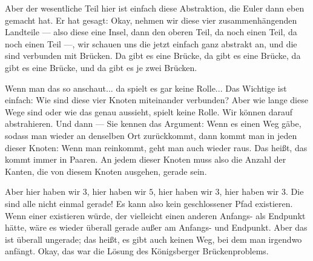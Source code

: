 \begin{spoken-clean}[00:08:07 - 00:09:33]
Aber der wesentliche Teil hier ist einfach diese Abstraktion, die Euler dann eben gemacht hat. Er hat gesagt: Okay, nehmen wir diese vier zusammenhängenden Landteile --- also diese eine Insel, dann den oberen Teil, da noch einen Teil, da noch einen Teil ---, wir schauen uns die jetzt einfach ganz abstrakt an, und die sind verbunden mit Brücken. Da gibt es eine Brücke, da gibt es eine Brücke, da gibt es eine Brücke, und da gibt es je zwei Brücken.

Wenn man das so anschaut... da spielt es gar keine Rolle... Das Wichtige ist einfach: Wie sind diese vier Knoten miteinander verbunden? Aber wie lange diese Wege sind oder wie das genau aussieht, spielt keine Rolle. Wir können darauf abstrahieren. Und dann --- Sie kennen das Argument: Wenn es einen Weg gäbe, sodass man wieder an denselben Ort zurückkommt, dann kommt man in jeden dieser Knoten: Wenn man reinkommt, geht man auch wieder raus. Das heißt, das kommt immer in Paaren. An jedem dieser Knoten muss also die Anzahl der Kanten, die von diesem Knoten ausgehen, gerade sein.

Aber hier haben wir $3$, hier haben wir $5$, hier haben wir $3$, hier haben wir $3$. Die sind alle nicht einmal gerade! Es kann also kein geschlossener Pfad existieren. Wenn einer existieren würde, der vielleicht einen anderen Anfangs- als Endpunkt hätte, wäre es wieder überall gerade außer am Anfangs- und Endpunkt. Aber das ist überall ungerade; das heißt, es gibt auch keinen Weg, bei dem man irgendwo anfängt. Okay, das war die Lösung des Königsberger Brückenproblems.
\end{spoken-clean}

